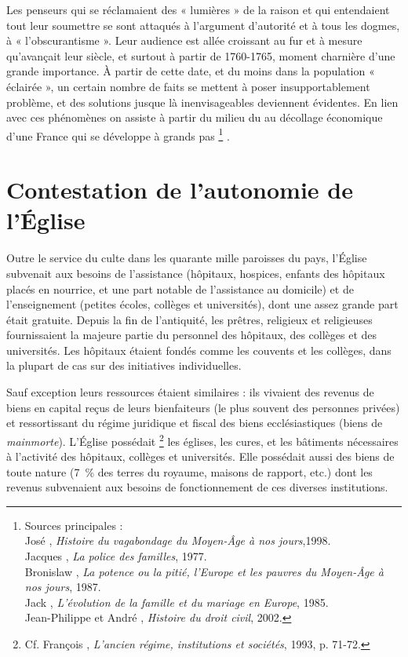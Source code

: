 

 Les penseurs qui se réclamaient des « lumières » de la raison et qui entendaient tout leur soumettre se sont attaqués à l'argument d'autorité et à tous les dogmes, à « l'obscurantisme ». Leur audience est allée croissant au fur et à mesure qu'avançait leur siècle, et surtout à partir de 1760-1765, moment charnière d'une grande importance. À partir de cette date, et du moins dans la population « éclairée », un certain nombre de faits se mettent à poser insupportablement problème, et des solutions jusque là inenvisageables deviennent évidentes. En lien avec ces phénomènes on assiste à partir du milieu du  au décollage économique d'une France qui se développe à grands pas%
\footnote{Sources principales :
\\José , \emph{Histoire du vagabondage du Moyen-Âge à nos jours},1998.
\\Jacques {}, \emph{La police des familles}, 1977.
\\Bronislaw {}, \emph{La potence ou la pitié, l'Europe et les pauvres du Moyen-Âge à nos jours}, 1987.
\\Jack {}, \emph{L'évolution de la famille et du mariage en Europe}, 1985.
\\Jean-Philippe  et André , \emph{Histoire du droit civil}, 2002.}%
.

 
\section{Contestation de l'autonomie de l'Église}

 Outre le service du culte dans les quarante mille paroisses du pays, l'Église subvenait aux besoins de l'assistance (hôpitaux, hospices, enfants des hôpitaux placés en nourrice, et une part notable de l'assistance au domicile) et de l'enseignement (petites écoles, collèges et universités), dont une assez grande part était gratuite. Depuis la fin de l'antiquité, les prêtres, religieux et religieuses fournissaient la majeure partie du personnel des hôpitaux, des collèges et des universités. Les hôpitaux étaient fondés comme les couvents et les collèges, dans la plupart de cas sur des initiatives individuelles. 

 Sauf exception leurs ressources étaient similaires : ils vivaient des revenus de biens en capital reçus de leurs bienfaiteurs (le plus souvent des personnes privées) et ressortissant du régime juridique et fiscal des biens ecclésiastiques (biens de \emph{mainmorte}). L'Église possédait%
\footnote{Cf. François , \emph{L'ancien régime, institutions et sociétés}, 1993, p. 71-72.} 
les églises, les cures, et les bâtiments nécessaires à l'activité des hôpitaux, collèges et universités. Elle possédait aussi des biens de toute nature (7~\% des terres du royaume, maisons de rapport, etc.) dont les revenus subvenaient aux besoins de fonctionnement de ces diverses institutions. 

